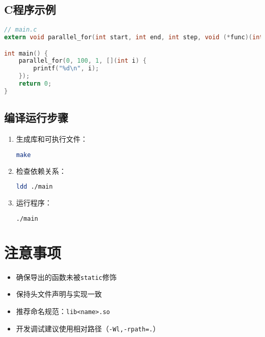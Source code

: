 \documentclass{article}
\begin{document}
\subsection{C程序示例}
\begin{lstlisting}[language=C]
// main.c
extern void parallel_for(int start, int end, int step, void (*func)(int));

int main() {
    parallel_for(0, 100, 1, [](int i) {
        printf("%d\n", i);
    });
    return 0;
}
\end{lstlisting}

\subsection{编译运行步骤}
\begin{enumerate}
    \item 生成库和可执行文件：
    \begin{lstlisting}[language=bash]
    make
    \end{lstlisting}
    
    \item 检查依赖关系：
    \begin{lstlisting}[language=bash]
    ldd ./main
    \end{lstlisting}
    
    \item 运行程序：
    \begin{lstlisting}[language=bash]
    ./main
    \end{lstlisting}
\end{enumerate}

\section{注意事项}
\begin{itemize}
    \item 确保导出的函数未被\texttt{static}修饰
    \item 保持头文件声明与实现一致
    \item 推荐命名规范：\texttt{lib<name>.so}
    \item 开发调试建议使用相对路径（\texttt{-Wl,-rpath=.}）
\end{itemize}
\end{document}

